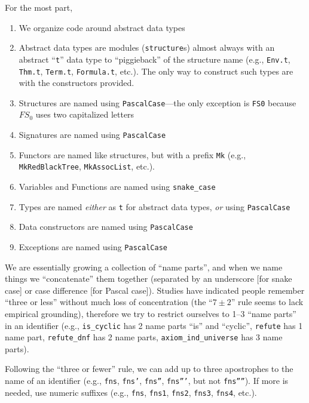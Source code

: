 \begin{node}
For the most part,
\begin{enumerate}
\item We organize code around abstract data types
\item Abstract data types are modules (\texttt{structure}s) almost
  always with an abstract ``\texttt{t}'' data type to ``piggieback''
  of the structure name (e.g., \texttt{Env.t}, \texttt{Thm.t},
  \texttt{Term.t}, \texttt{Formula.t}, etc.). The only way to
  construct such types are with the constructors provided.
\item Structures are named using \texttt{PascalCase}---the only
  exception is \texttt{FS0} because $FS_{0}$ uses two capitalized letters
\item Signatures are named using \texttt{PascalCase}
\item Functors are named like structures, but with a prefix
  \texttt{Mk} (e.g., \texttt{MkRedBlackTree}, \texttt{MkAssocList}, etc.).
\item Variables and Functions are named using \texttt{snake\_case}
\item Types are named \emph{either} as \texttt{t} for abstract data
  types, \emph{or} using \texttt{PascalCase}
\item Data constructors are named using \texttt{PascalCase}
\item Exceptions are named using \texttt{PascalCase}
\end{enumerate}
We are essentially growing a collection of ``name parts'', and when we
name things we ``concatenate'' them together (separated by an
underscore [for snake case] or case difference [for Pascal case]).
Studies have indicated people remember ``three or less'' without much
loss of concentration (the ``$7\pm2$'' rule seems to lack empirical grounding),
therefore we try to restrict ourselves to 1--3 ``name parts'' in an
identifier (e.g., \texttt{is\_cyclic} has 2 name parts ``is'' and ``cyclic'',
\texttt{refute} has 1 name part, \texttt{refute\_dnf} has 2 name
parts, \texttt{axiom\_ind\_universe} has 3 name parts).
\end{node}

\begin{node}
Following the ``three or fewer'' rule, we can add up to three
apostrophes to the name of an identifier (e.g., \texttt{fns},
\texttt{fns'}, \texttt{fns''}, \texttt{fns'''}, but not \texttt{fns''''}).
If more is needed, use numeric suffixes (e.g., \texttt{fns},
\texttt{fns1}, \texttt{fns2}, \texttt{fns3}, \texttt{fns4}, etc.).
\end{node}

